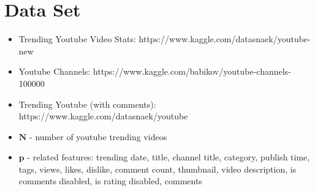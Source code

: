 \documentclass[english]{article}
\begin{document}
\section{Data Set}
\begin{itemize}
\item Trending Youtube Video Stats: https://www.kaggle.com/datasnaek/youtube-new
\item Youtube Channels: https://www.kaggle.com/babikov/youtube-channels-100000
\item Trending Youtube (with comments): https://www.kaggle.com/datasnaek/youtube
\item $\textbf{N}$ - number of youtube trending videos
\item $\textbf{p}$ - related features: trending date, title, channel title, category, publish time, tags, views, likes, dislike, comment count, thumbnail, video description, is comments disabled, is rating disabled, comments
\end{itemize}
\end{document}
